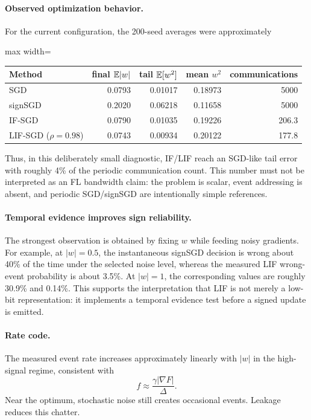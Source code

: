 \paragraph{Observed optimization behavior.}
For the current configuration, the 200-seed averages were approximately
\begin{center}
\begin{adjustbox}{max width=\textwidth}
\begin{tabular}{lrrrr}
\toprule
Method & final $\mathbb{E}|w|$ & tail $\mathbb{E}[w^2]$ & mean $w^2$ & communications \\
\midrule
SGD & 0.0793 & 0.01017 & 0.18973 & 5000 \\
signSGD & 0.2020 & 0.06218 & 0.11658 & 5000 \\
IF-SGD & 0.0790 & 0.01035 & 0.19226 & 206.3 \\
LIF-SGD ($\rho=0.98$) & 0.0743 & 0.00934 & 0.20122 & 177.8 \\
\bottomrule
\end{tabular}
\end{adjustbox}
\end{center}
Thus, in this deliberately small diagnostic, IF/LIF reach an SGD-like tail error with roughly 4\% of the periodic communication count. This number must not be interpreted as an FL bandwidth claim: the problem is scalar, event addressing is absent, and periodic SGD/signSGD are intentionally simple references.

\paragraph{Temporal evidence improves sign reliability.}
The strongest observation is obtained by fixing $w$ while feeding noisy gradients. For example, at $|w|=0.5$, the instantaneous signSGD decision is wrong about 40\% of the time under the selected noise level, whereas the measured LIF wrong-event probability is about 3.5\%. At $|w|=1$, the corresponding values are roughly 30.9\% and 0.14\%. This supports the interpretation that LIF is not merely a low-bit representation: it implements a temporal evidence test before a signed update is emitted.

\paragraph{Rate code.}
The measured event rate increases approximately linearly with $|w|$ in the high-signal regime, consistent with
\begin{equation}
  f\approx\frac{\gamma|\nabla F|}{\Delta}.
\end{equation}
Near the optimum, stochastic noise still creates occasional events. Leakage reduces this chatter.

